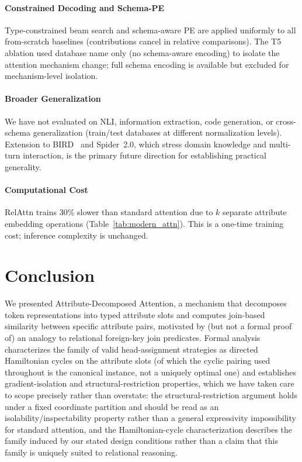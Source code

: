 \documentclass[review]{elsarticle}
\begin{document}
\paragraph{Constrained Decoding and Schema-PE}
Type-constrained beam search and schema-aware PE are applied uniformly to all from-scratch baselines (contributions cancel in relative comparisons). The T5 ablation used database name only (no schema-aware encoding) to isolate the attention mechanism change; full schema encoding is available but excluded for mechanism-level isolation.

\paragraph{Broader Generalization}
We have not evaluated on NLI, information extraction, code generation, or cross-schema generalization (train/test databases at different normalization levels). Extension to BIRD~\cite{li2023bird} and Spider~2.0, which stress domain knowledge and multi-turn interaction, is the primary future direction for establishing practical generality.

\paragraph{Computational Cost}
RelAttn trains 30\% slower than standard attention due to $k$ separate attribute embedding operations (Table~\ref{tab:modern_attn}). This is a one-time training cost; inference complexity is unchanged.

\section{Conclusion}
\label{sec:conclusion}

We presented Attribute-Decomposed Attention, a mechanism that decomposes token representations into typed attribute slots and computes join-based similarity between specific attribute pairs, motivated by (but not a formal proof of) an analogy to relational foreign-key join predicates. Formal analysis characterizes the family of valid head-assignment strategies as directed Hamiltonian cycles on the attribute slots (of which the cyclic pairing used throughout is the canonical instance, not a uniquely optimal one) and establishes gradient-isolation and structural-restriction properties, which we have taken care to scope precisely rather than overstate: the structural-restriction argument holds under a fixed coordinate partition and should be read as an isolability/inspectability property rather than a general expressivity impossibility for standard attention, and the Hamiltonian-cycle characterization describes the family induced by our stated design conditions rather than a claim that this family is uniquely suited to relational reasoning.
\end{document}
